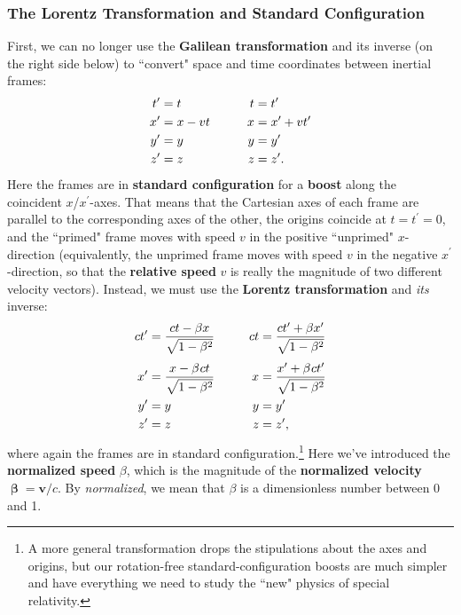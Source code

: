 \documentclass[12pt]{article}
\newcommand{\abs}[1]{\mathnormal \vv{#1}}
\renewcommand{\vv}[1]{\mathbf{#1}}
\newcommand{\vvbeta}{\bm{\upbeta}}
\begin{document}
\subsubsection{The Lorentz Transformation and Standard Configuration}\label{sssec:lt}
First, we can no longer use the \textbf{Galilean transformation} and its inverse (on the right side below) to ``convert" space and time coordinates between inertial frames:
\begin{equation*}
\begin{aligned}
t^{\prime} &= t& t&= t^\prime \\
x^{\prime} &= x - \abs vt& \qquad x &= x^\prime + \abs vt^\prime\\
y^{\prime} &= y& y&= y^\prime\\
z^{\prime} &= z& z&= z^\prime .
\end{aligned}
\end{equation*}
Here the frames are in \textbf{standard configuration} for a \textbf{boost} along the coincident $x$/$x^\prime$-axes. That means that the Cartesian axes of each frame are parallel to the corresponding axes of the other, the origins coincide at $t=t^\prime=0$, and the ``primed" frame moves with speed $v$ in the positive ``unprimed" $x$-direction (equivalently, the unprimed frame moves with speed $v$ in the negative $x^\prime$-direction, so that the \textbf{relative speed} $v$ is really the magnitude of two different velocity vectors). Instead, we must use the \textbf{Lorentz transformation} and \emph{its} inverse:
\begin{equation}\label{eq:lt}
\begin{aligned}
ct^{\prime} &= \dfrac{ct - \beta x}{\sqrt{1- \beta ^2}}& ct &= \dfrac{ct^\prime + \beta x^\prime}{\sqrt{1- \beta ^2}} \\[3pt]
x^{\prime} &= \dfrac{x - \beta \mkern1mu c t}{\sqrt{1- \beta ^2}}& \qquad x &= \dfrac{x^\prime + \beta \mkern1mu c t^\prime}{\sqrt{1- \beta ^2}}\\
y^{\prime} &= y& y&= y^\prime \\
z^{\prime} &= z& z&= z^\prime,
\end{aligned}
\end{equation}
where again the frames are in standard configuration.\footnote{A more general transformation drops the stipulations about the axes and origins, but our rotation-free standard-configuration boosts are much simpler and have everything we need to study the ``new" physics of special relativity.} Here we've introduced the \textbf{normalized speed} $\beta$, which is the magnitude of the \textbf{normalized velocity} $\vvbeta=\vv v/c$. By \emph{normalized}, we mean that $\beta$ is a dimensionless number between 0 and 1.
\end{document}
